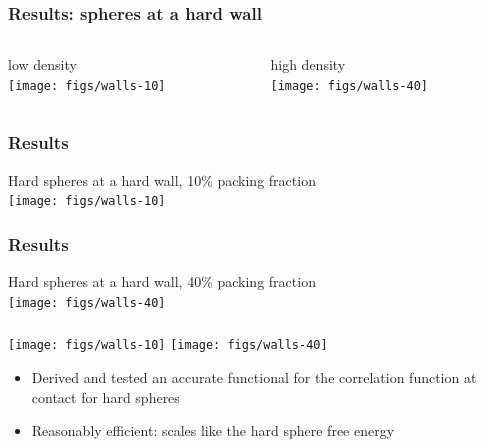 \begin{frame}
  \frametitle{Results:  spheres at a hard wall}
  \begin{columns}
    \begin{column}{0.5\columnwidth}
      \begin{center}
        low density\\
        \texttt{[image: figs/walls-10]}
      \end{center}
    \end{column}
    \begin{column}{0.5\columnwidth}
      \begin{center}
        high density\\
        \texttt{[image: figs/walls-40]}
      \end{center}
    \end{column}
  \end{columns}
\end{frame}

\begin{frame}
  \frametitle{Results}
  \begin{center}
    Hard spheres at a hard wall, 10\% packing fraction\\
    \texttt{[image: figs/walls-10]}
  \end{center}
\end{frame}

\begin{frame}
  \frametitle{Results}
  \begin{center}
    Hard spheres at a hard wall, 40\% packing fraction\\
    \texttt{[image: figs/walls-40]}
  \end{center}
\end{frame}

\begin{frame}
  \frametitle{\conclude}
  \begin{center}
    \texttt{[image: figs/walls-10]}
    \texttt{[image: figs/walls-40]}
  \end{center}
  \begin{itemize}
  \item Derived and tested an accurate functional for the correlation
    function at contact for hard spheres
  \item Reasonably efficient: scales like the hard sphere free energy
  \end{itemize}
\end{frame}
